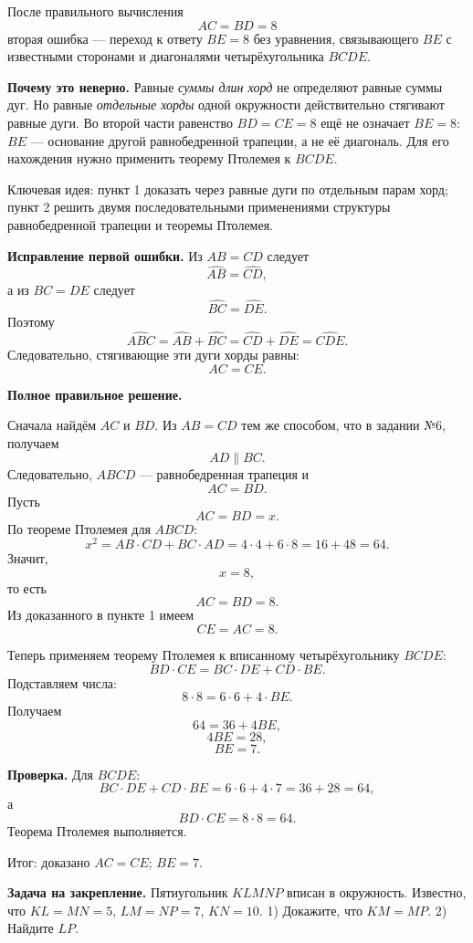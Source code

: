 \documentclass[12pt,a4paper]{article}
\newcommand{\keyidea}[1]{\textcolor{blue!60!black}{Ключевая идея:} #1}
\newcommand{\resultlabel}[1]{\textcolor{teal!60!black}{Итог:} #1}
\begin{document}
После правильного вычисления
\[
AC=BD=8
\]
вторая ошибка --- переход к ответу $BE=8$ без уравнения, связывающего $BE$ с известными сторонами и диагоналями четырёхугольника $BCDE$.

\textbf{Почему это неверно.} Равные \emph{суммы длин хорд} не определяют равные суммы дуг. Но равные \emph{отдельные хорды} одной окружности действительно стягивают равные дуги. Во второй части равенство $BD=CE=8$ ещё не означает $BE=8$: $BE$ --- основание другой равнобедренной трапеции, а не её диагональ. Для его нахождения нужно применить теорему Птолемея к $BCDE$.

\keyidea{пункт 1 доказать через равные дуги по отдельным парам хорд; пункт 2 решить двумя последовательными применениями структуры равнобедренной трапеции и теоремы Птолемея.}

\textbf{Исправление первой ошибки.} Из $AB=CD$ следует
\[
\widehat{AB}=\widehat{CD},
\]
а из $BC=DE$ следует
\[
\widehat{BC}=\widehat{DE}.
\]
Поэтому
\[
\widehat{ABC}=\widehat{AB}+\widehat{BC}
=\widehat{CD}+\widehat{DE}
=\widehat{CDE}.
\]
Следовательно, стягивающие эти дуги хорды равны:
\[
AC=CE.
\]

\textbf{Полное правильное решение.}

Сначала найдём $AC$ и $BD$. Из $AB=CD$ тем же способом, что в задании №6, получаем
\[
AD\parallel BC.
\]
Следовательно, $ABCD$ --- равнобедренная трапеция и
\[
AC=BD.
\]
Пусть
\[
AC=BD=x.
\]
По теореме Птолемея для $ABCD$:
\[
x^2=AB\cdot CD+BC\cdot AD
=4\cdot4+6\cdot8
=16+48=64.
\]
Значит,
\[
x=8,
\]
то есть
\[
AC=BD=8.
\]
Из доказанного в пункте 1 имеем
\[
CE=AC=8.
\]

Теперь применяем теорему Птолемея к вписанному четырёхугольнику $BCDE$:
\[
BD\cdot CE=BC\cdot DE+CD\cdot BE.
\]
Подставляем числа:
\[
8\cdot8=6\cdot6+4\cdot BE.
\]
Получаем
\[
64=36+4BE,
\]
\[
4BE=28,
\]
\[
BE=7.
\]

\textbf{Проверка.} Для $BCDE$:
\[
BC\cdot DE+CD\cdot BE=6\cdot6+4\cdot7=36+28=64,
\]
а
\[
BD\cdot CE=8\cdot8=64.
\]
Теорема Птолемея выполняется.

\resultlabel{доказано $AC=CE$; $BE=7$.}

\textbf{Задача на закрепление.} Пятиугольник $KLMNP$ вписан в окружность. Известно, что $KL=MN=5$, $LM=NP=7$, $KN=10$. 1) Докажите, что $KM=MP$. 2) Найдите $LP$.
\end{document}
